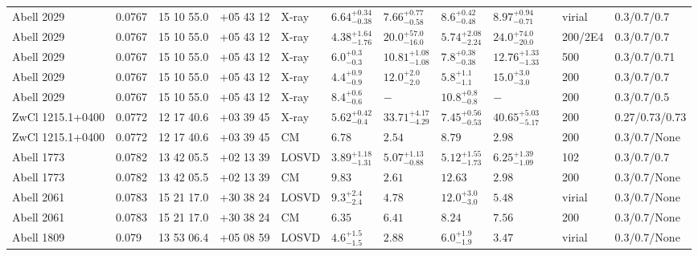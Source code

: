 \begin{landscape}
\begin{center}
{\begin{longtable}{llllllllllll}
Abell 2029 & 0.0767 & 15 10 55.0 & +05 43 12 & X-ray & ${6.64}^{+0.34}_{-0.38}$ & ${7.66}^{+0.77}_{-0.58}$ & ${8.6}^{+0.42}_{-0.48}$ & ${8.97}^{+0.94}_{-0.71}$ & \citet{SC07.1} & virial & 0.3/0.7/0.7 \\
Abell 2029 & 0.0767 & 15 10 55.0 & +05 43 12 & X-ray & ${4.38}^{+1.64}_{-1.76}$ & ${20.0}^{+57.0}_{-16.0}$ & ${5.74}^{+2.08}_{-2.24}$ & ${24.0}^{+74.0}_{-20.0}$ & \citet{VO06.1} & 200/2E4 & 0.3/0.7/0.7 \\
Abell 2029 & 0.0767 & 15 10 55.0 & +05 43 12 & X-ray & ${6.0}^{+0.3}_{-0.3}$ & ${10.81}^{+1.08}_{-1.08}$ & ${7.8}^{+0.38}_{-0.38}$ & ${12.76}^{+1.33}_{-1.33}$ & \citet{VI06.1} & 500 & 0.3/0.7/0.71 \\
Abell 2029 & 0.0767 & 15 10 55.0 & +05 43 12 & X-ray & ${4.4}^{+0.9}_{-0.9}$ & ${12.0}^{+2.0}_{-2.0}$ & ${5.8}^{+1.1}_{-1.1}$ & ${15.0}^{+3.0}_{-3.0}$ & \citet{LE03.1} & 200 & 0.3/0.7/0.7 \\
Abell 2029 & 0.0767 & 15 10 55.0 & +05 43 12 & X-ray & ${8.4}^{+0.6}_{-0.6}$ & ${-}^{}_{}$ & ${10.8}^{+0.8}_{-0.8}$ & ${-}^{}_{}$ & \citet{XU01.1} & 200 & 0.3/0.7/0.5 \\
ZwCl 1215.1+0400 & 0.0772 & 12 17 40.6 & +03 39 45 & X-ray & ${5.62}^{+0.42}_{-0.4}$ & ${33.71}^{+4.17}_{-4.29}$ & ${7.45}^{+0.56}_{-0.53}$ & ${40.65}^{+5.03}_{-5.17}$ & \citet{BA14.1} & 200 & 0.27/0.73/0.73 \\
ZwCl 1215.1+0400 & 0.0772 & 12 17 40.6 & +03 39 45 & CM & ${6.78}^{}_{}$ & ${2.54}^{}_{}$ & ${8.79}^{}_{}$ & ${2.98}^{}_{}$ & \citet{RI06.1} & 200 & 0.3/0.7/None \\
Abell 1773 & 0.0782 & 13 42 05.5 & +02 13 39 & LOSVD & ${3.89}^{+1.18}_{-1.31}$ & ${5.07}^{+1.13}_{-0.88}$ & ${5.12}^{+1.55}_{-1.73}$ & ${6.25}^{+1.39}_{-1.09}$ & \citet{WO10.1} & 102 & 0.3/0.7/0.7 \\
Abell 1773 & 0.0782 & 13 42 05.5 & +02 13 39 & CM & ${9.83}^{}_{}$ & ${2.61}^{}_{}$ & ${12.63}^{}_{}$ & ${2.98}^{}_{}$ & \citet{RI06.1} & 200 & 0.3/0.7/None \\
Abell 2061 & 0.0783 & 15 21 17.0 & +30 38 24 & LOSVD & ${9.3}^{+2.4}_{-2.4}$ & ${4.78}^{}_{}$ & ${12.0}^{+3.0}_{-3.0}$ & ${5.48}^{}_{}$ & \citet{AB11.1} & virial & 0.3/0.7/None \\
Abell 2061 & 0.0783 & 15 21 17.0 & +30 38 24 & CM & ${6.35}^{}_{}$ & ${6.41}^{}_{}$ & ${8.24}^{}_{}$ & ${7.56}^{}_{}$ & \citet{RI06.1} & 200 & 0.3/0.7/None \\
Abell 1809 & 0.079 & 13 53 06.4 & +05 08 59 & LOSVD & ${4.6}^{+1.5}_{-1.5}$ & ${2.88}^{}_{}$ & ${6.0}^{+1.9}_{-1.9}$ & ${3.47}^{}_{}$ & \citet{AB11.1} & virial & 0.3/0.7/None \\

\end{longtable}}
\end{center}
\end{landscape}
